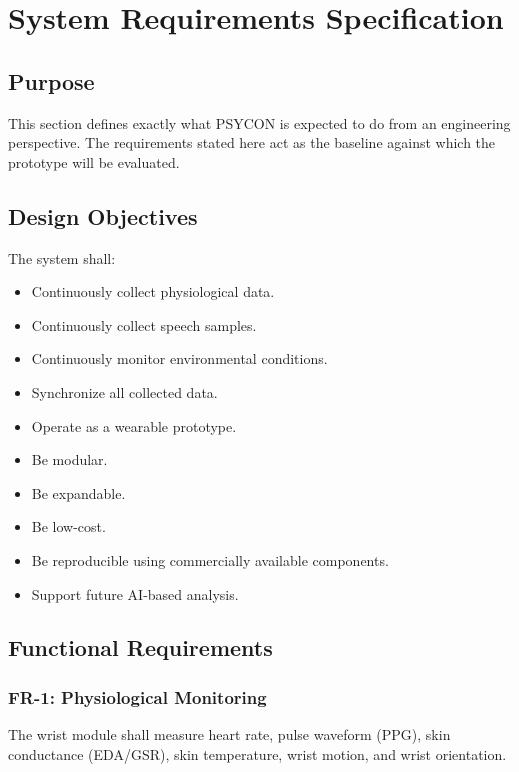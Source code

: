 \section{System Requirements Specification}
\label{sec:srs}

\subsection{Purpose}
\label{sec:srs-purpose}

This section defines exactly what PSYCON is expected to do from an engineering perspective. The requirements stated here act as the baseline against which the prototype will be evaluated.

\subsection{Design Objectives}
\label{sec:design-objectives}

The system shall:
\begin{itemize}
    \item Continuously collect physiological data.
    \item Continuously collect speech samples.
    \item Continuously monitor environmental conditions.
    \item Synchronize all collected data.
    \item Operate as a wearable prototype.
    \item Be modular.
    \item Be expandable.
    \item Be low-cost.
    \item Be reproducible using commercially available components.
    \item Support future AI-based analysis.
\end{itemize}

\subsection{Functional Requirements}
\label{sec:functional-requirements}

\subsubsection{FR-1: Physiological Monitoring}
The wrist module shall measure heart rate, pulse waveform (PPG), skin conductance (EDA/GSR), skin temperature, wrist motion, and wrist orientation.

